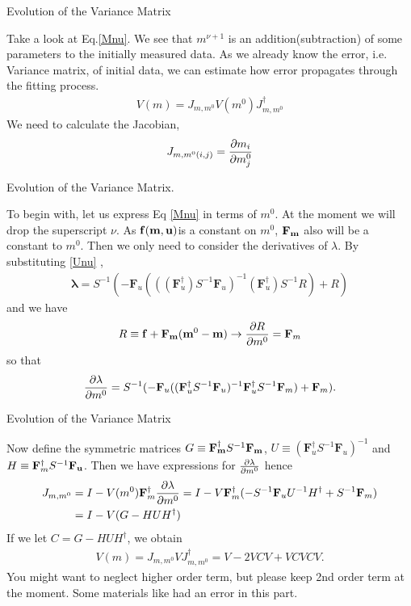 \documentclass[
	xcolor=dvipsnames,
	aspectratio=169,	
	10pt, 
	]{beamer}
\begin{document}
\begin{frame}{Evolution of the Variance Matrix}
	\begin{block}{}
		Take a look at Eq.\eqref{Mnu}. We see that $m^{\nu+1} $ is an addition(subtraction) of some parameters to the initially measured data. As we already know the error, i.e. Variance matrix, of initial data, we can estimate how error propagates through the fitting process. 
		\begin{align}
			V(m) = J_{m,m^0}V(m^0)J_{m,m^0}^\dagger
		\end{align}
		We need to calculate the Jacobian, 
		\begin{align}
			J_{m,m^0(i,j)} = \frac{\partial m_i}{\partial m^0_j}
		\end{align}
	\end{block}
\end{frame}
\begin{frame}{Evolution of the Variance Matrix.}
	\begin{block}{}
		To begin with, let us express Eq \eqref{Mnu} in terms of $m^0$. At the moment we will drop the superscript $\nu$. As $\mathbf{f}(\mathbf{m},\mathbf{u})$is a constant on $m^0$, $\mathbf{F}_{\mathbf{m}}$ also will be a constant to $m^0$. Then we only need to consider the derivatives of $\lambda$. By substituting \eqref{Unu} ,
		\begin{align}
	\mathbf\lambda = S^{-1}(-\mathbf F_u(((\mathbf{F}_u^\dagger) S^{-1}\mathbf F_u)^{-1}(\mathbf{F}_u^\dagger) S^{-1}R) + R)
		\end{align}
		and we have
		\begin{align}
			R\equiv \mathbf f + \mathbf{F}_\mathbf{m}(\mathbf{m}^0-\mathbf{m})\to \frac{\partial R}{\partial m^0}= \mathbf{F}_m
		\end{align} 
		so that 
		\begin{align}
			\frac{\partial \lambda}{\partial m^0}= S^{-1}(-\mathbf F_u((\mathbf{F}_u^\dagger S^{-1}\mathbf F_u)^{-1}\mathbf{F}_u^\dagger S^{-1}\mathbf{F}_m) + \mathbf{F}_m).
		\end{align}
	\end{block}
\end{frame}
\begin{frame}{Evolution of the Variance Matrix}
	\begin{block}{}
		Now define the symmetric matrices $G\equiv \mathbf{F_m^\dagger} S^{-1}\mathbf{F_m}$, $U\equiv (\mathbf{F}_u^\dagger S^{-1}\mathbf F_u)^{-1}$ and $H\equiv \mathbf{F}_m^\dagger S^{-1}\mathbf{F_u}$. Then we have expressions for $\frac{\partial \lambda}{\partial m^0}$ hence 
		\begin{align}
			J_{m,m^0}&=I - V(m^0)\mathbf{F}_m^\dagger\frac{\partial \lambda}{\partial m^0}=I - V\mathbf{F}^\dagger_m(-S^{-1}\mathbf{F}_u U^{-1}H^\dagger+S^{-1}\mathbf{F}_m)\nonumber\\
			&=I-V(G-HUH^\dagger)
		\end{align}
		If we let $C =G-HUH^\dagger$, we obtain
		\begin{align}
			V(m) = J_{m,m^0} VJ_{m,m^0}^\dagger =V -2 VCV  +VCVCV.\label{Vm}
		\end{align}
		You might want to neglect higher order term, but please keep 2nd order term at the moment. Some materials like \cite{Prob} had an error in this part.
	\end{block}
\end{frame}
\end{document}
